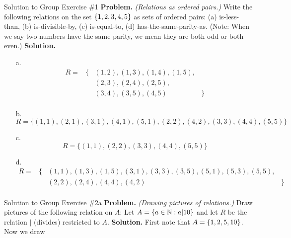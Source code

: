 \documentclass[10pt]{beamer}
\begin{document}
\begin{frame}{Solution to Group Exercise \#1}
\footnotesize 
\textbf{Problem.} \textit{(Relations as ordered pairs.)}  Write the following relations on the set $\{ {1,2,3,4,5} \}$ as sets of ordered pairs: (a) is-less-than, (b) is-divisible-by, (c) is-equal-to, (d) has-the-same-parity-as.  (Note: When we say two numbers have the same parity, we mean they are both odd or both even.)
\vfill 
\textbf{Solution.}
\begin{itemize}
\item[a.]
\[ \begin{array}{cccc}
R= & \bigg\{ & (1,2), (1,3), (1,4), (1,5), & \\
  & & (2,3), (2,4), (2,5),  &\\
   & & (3,4), (3,5), (4,5)  & \bigg\} \\
\end{array} \]    

\item[b.]
\[ R= \bigg\{  (1,1), (2,1), (3,1), (4,1), (5,1),(2,2), (4,2), (3,3), (4,4), (5,5)  \bigg\} \]
\item[c.]
\[ R= \bigg\{  (1,1), (2,2), (3,3), (4,4), (5,5)  \bigg\} \]
\item[d.]
\[ \begin{array}{cccc}
R= & \bigg\{ & (1,1), (1,3), (1,5), (3,1), (3,3), (3,5), (5,1), (5,3), (5,5), & \\
   & & (2,2), (2,4), (4,4), (4,2)  & \bigg\} \\
\end{array} \]  
\end{itemize}
\end{frame}

\begin{frame}{Solution to Group Exercise \#2a}
\textbf{Problem.} \textit{(Drawing pictures of relations.)} 
	Draw pictures of the following relation on $A$: Let $A=\{ {a \in \mathbb{N} : a|10} \}$ and let $R$ be the relation $|$ (divides) restricted to $A$. 
\vfill 
\textbf{Solution.} First note that $A=\{ {1,2,5,10} \}$.  Now we draw

\begin{center}
\end{center}

\end{frame}
\end{document}
